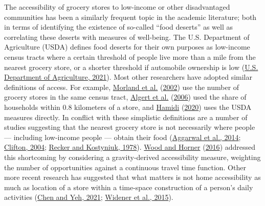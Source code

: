 \documentclass[3p, authoryear, review]{elsarticle} %
\begin{document}
The accessibility of grocery stores to low-income or other disadvantaged
communities has been a similarly frequent topic in the academic literature;
both in terms of identifying the existence of so-called ``food deserts'' as well
as correlating these deserts with measures of well-being. The U.S. Department of
Agriculture (USDA) defines food deserts for their own purposes as low-income census tracts
where a certain threshold of people live more than a mile from the nearest
grocery store, or a shorter threshold if automobile ownership is low (\protect\hyperlink{ref-usdafara}{U.S. Department of Agriculture, 2021}).
Most other researchers have adopted similar definitions of access. For example,
\protect\hyperlink{ref-morland2002}{Morland et al.} (\protect\hyperlink{ref-morland2002}{2002}) use the number of grocery stores in the same census tract, \protect\hyperlink{ref-algert2006}{Algert et al.} (\protect\hyperlink{ref-algert2006}{2006})
used the share of households within 0.8 kilometers of a store, and \protect\hyperlink{ref-hamidi2020}{Hamidi} (\protect\hyperlink{ref-hamidi2020}{2020})
uses the USDA measures directly.
In conflict with these simplistic definitions are
a number of studies suggesting that the nearest grocery store is not necessarily
where people --- including low-income people --- obtain their food
(\protect\hyperlink{ref-aggarwal2014}{Aggarwal et al., 2014}; \protect\hyperlink{ref-clifton2004}{Clifton, 2004}; \protect\hyperlink{ref-recker1978}{Recker and Kostyniuk, 1978}). \protect\hyperlink{ref-wood2016}{Wood and Horner} (\protect\hyperlink{ref-wood2016}{2016}) addressed this shortcoming
by considering a gravity-derived accessibility measure, weighting the number of
opportunities against a continuous travel time function. Other more recent research
has suggested that what matters
is not home accessibility as much as location of a store within a time-space construction
of a person's daily activities (\protect\hyperlink{ref-chen2021effects}{Chen and Yeh, 2021}; \protect\hyperlink{ref-widener2015spatiotemporal}{Widener et al., 2015}).
\end{document}
